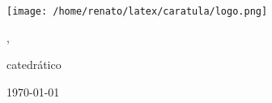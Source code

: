 \begin{titlepage} 
	\centering
	\texttt{[image: /home/renato/latex/caratula/logo.png]}\par\vspace{1cm}
	{\scshape\LARGE \universidad \par}
	\vspace{1cm}
	{\scshape\Large \curso \par}
	\vspace{1.5cm}
	{\huge\bfseries \titulo \par}
	\vspace{2cm}
	{\Large \nombre , \carnet \par}
	\vfill
	catedrático\par
	\catedratico

	\vfill

	{\large \today\par}
\end{titlepage}
